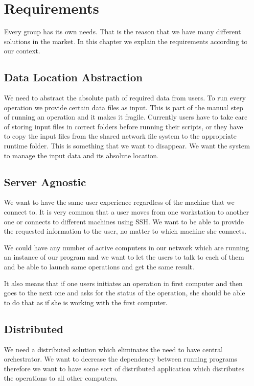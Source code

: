 \chapter{Requirements}
\label{cha:requirements}

Every group has its own needs. That is the reason that we have many different solutions in the market.
In this chapter we explain the requirements according to our context.

\section{Data Location Abstraction}
We need to abstract the absolute path of required data from users. To run every operation
we provide certain data files as input. This is part of the manual step of running an operation and
it makes it fragile. Currently users have to take care of storing input files in correct folders before
running their scripts, or they have to copy the input files from the shared network file system to the
appropriate runtime folder. This is something that we want to disappear. We want the system to 
manage the input data and its absolute location.

\section{Server Agnostic}
We want to have the same user experience regardless of the machine that we connect to. It is very common
that a user moves from one workstation to another one or connects to different machines using SSH. We 
want to be able to provide the requested information to the user, no matter to which machine she connects.

We could have any number of active computers in our network which are running an instance of our program
and we want to let the users to talk to each of them and be able to launch same operations and get the same result.

It also means that if one users initiates an operation in first computer and then goes to the next one and asks
for the status of the operation, she should be able to do that as if she is working with the first computer.

\section{Distributed}
We need a distributed solution which eliminates the need to have central orchestrator.
We want to decrease the dependency between running programs therefore we want to have 
some sort of distributed application which distributes the operations to all other computers.

